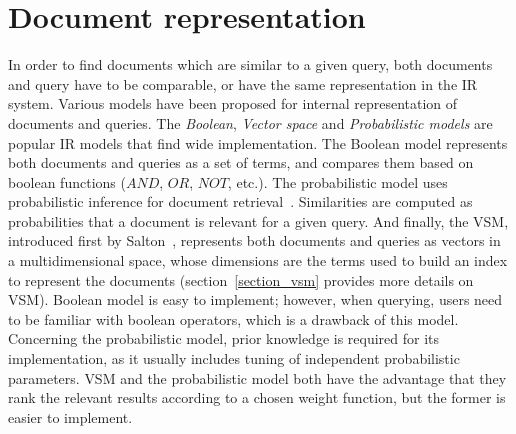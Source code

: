 \section{Document representation}
\label{sec:lsa:doc_repres}
In order to find documents which are similar to a given query, both documents and query have to be comparable, or have the same representation in the \gls{IR} system. Various models have been proposed for internal representation of documents and queries. The \textit{Boolean}, \textit{Vector space} and \textit{Probabilistic models} are popular \gls{IR} models that find wide implementation. The Boolean model represents both documents and queries as a set of terms, and compares them based on boolean functions ($AND$, $OR$, $NOT$, etc.). The probabilistic model uses probabilistic inference for document retrieval~\cite{probabilistic77}. Similarities are computed as probabilities that a document is relevant for a given query. And finally, the \gls{VSM}, introduced first by Salton~\cite{VSM_Salton89}, represents both documents and queries as vectors in a multidimensional space, whose dimensions are the terms used to build an index to represent the documents (section~\ref{section_vsm} provides more details on \gls{VSM}). Boolean model is easy to implement; however, when querying, users need to be familiar with boolean operators, which is a drawback of this model. Concerning the probabilistic model, prior knowledge is required for its implementation, as it usually includes tuning of independent probabilistic parameters. \gls{VSM} and the probabilistic model both have the advantage that they rank the relevant results according to a chosen weight function, but the former is easier to implement. \\

